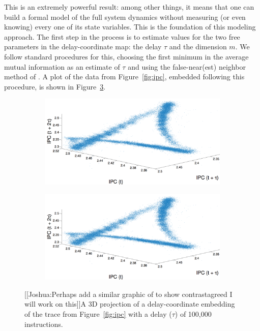 This is an extremely powerful result: among other things, it means
that one can build a formal model of the full system dynamics without
measuring (or even knowing) every one of its state variables.  This is
the foundation of this modeling approach.
The first step in the process is to estimate values for the two free
parameters in the delay-coordinate map: the delay $\tau$ and the
dimension $m$.  We follow standard procedures for this, choosing the
first minimum in the average mutual information as an estimate of
$\tau$ \cite{fraser-swinney} and using the false-near(est) neighbor
method of \cite{KBA92}.  A
plot of the data from Figure~\ref{fig:ipc}, embedded following this
procedure, is shown in Figure~\ref{fig:embedding}.


 \begin{figure}
   \centering
\begin{subfigure}{0.49\textwidth}
    \includegraphics[width=\textwidth]{figs/colipc3d.png}
    \caption{\col }
    \label{fig:colEmbedding}
  \end{subfigure}%
  \begin{subfigure}{0.49\textwidth}
    \includegraphics[width=\textwidth]{figs/colipc3d.png}
    \caption{\gcc}
    \label{fig:gccEmbedding}
  \end{subfigure}%
   
     \caption{[[{\color{red}Joshua:Perhaps add a similar graphic of \gcc to show contrast}{\color{green}agreed I will work on this}]]A 3D projection of a delay-coordinate embedding of the trace
 from Figure~\ref{fig:ipc} with a delay ($\tau$) of 100,000 instructions.
 }
 \label{fig:embedding}
 \end{figure}


